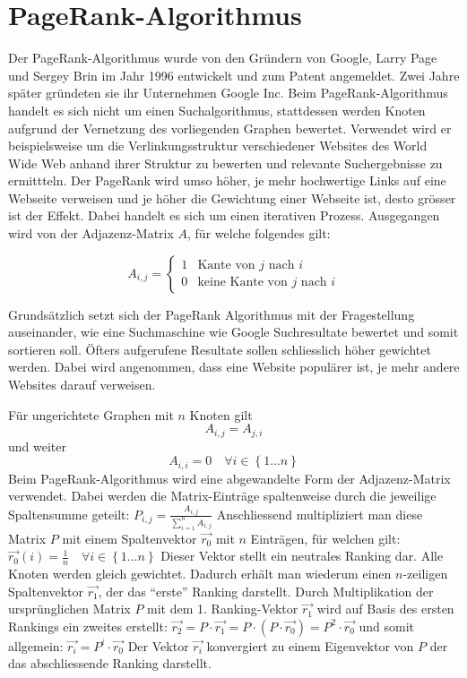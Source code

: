 \section{PageRank-Algorithmus}
Der PageRank-Algorithmus wurde von den Gründern von Google, Larry Page und Sergey Brin im Jahr 1996 entwickelt und zum Patent angemeldet. Zwei Jahre später gründeten sie ihr Unternehmen Google Inc.
Beim PageRank-Algorithmus handelt es sich nicht um einen Suchalgorithmus, stattdessen werden Knoten aufgrund der Vernetzung des vorliegenden Graphen bewertet.
Verwendet wird er beispielsweise um die Verlinkungsstruktur verschiedener Websites des World Wide Web anhand ihrer Struktur zu bewerten und relevante Suchergebnisse zu ermittteln. Der PageRank wird umso höher, je mehr hochwertige Links auf eine Webseite verweisen und je höher die Gewichtung einer Webseite ist, desto grösser ist der Effekt.
Dabei handelt es sich um einen iterativen Prozess. Ausgegangen wird von der Adjazenz-Matrix $A$, für welche folgendes gilt:

\begin{equation}
A_{i,j}=\left\{ \begin{matrix}
1 & \text{Kante von $j$ nach $i$} \\ 0 & \text{keine Kante von $j$ nach $i$}
\end{matrix}
 \right.
\label{verkehr:Adja}
\end{equation}

Grundsätzlich setzt sich der PageRank Algorithmus mit der Fragestellung auseinander, wie eine Suchmaschine wie Google Suchresultate bewertet und somit sortieren soll. Öfters aufgerufene Resultate sollen schliesslich höher gewichtet werden. Dabei wird angenommen, dass eine Website populärer ist, je mehr andere Websites darauf verweisen.



Für ungerichtete Graphen mit $n$ Knoten gilt \begin{equation}A_{i,j}=A_{j,i}\end{equation} und weiter \begin{equation}A_{i,i}=0\quad\forall i\in \left\{1\dots n\right\}\end{equation}
Beim PageRank-Algorithmus wird eine abgewandelte Form der Adjazenz-Matrix verwendet.
Dabei werden die Matrix-Einträge spaltenweise durch die jeweilige Spaltensumme geteilt:
\( P_{i,j}=\frac{A_{i,j}}{\sum_{i=1}^{n}A_{i,j}} \)
Anschliessend multipliziert man diese Matrix $P$ mit einem Spaltenvektor $\Vec{r_0}$ mit $n$ Einträgen, für welchen gilt:
\( \Vec{r_0}(i) = \frac{1}{n} \quad\forall i\in \left\{1\dots n\right\} \)
Dieser Vektor stellt ein neutrales Ranking dar. Alle Knoten werden gleich gewichtet.
Dadurch erhält man wiederum einen $n$-zeiligen Spaltenvektor $\Vec{r_1}$, der das ``erste'' Ranking darstellt. Durch Multiplikation der ursprünglichen Matrix $P$ mit dem 1. Ranking-Vektor $\Vec{r_1}$ wird auf Basis des ersten Rankings ein zweites erstellt:
\( \Vec{r_2} = P\cdot\Vec{r_1} = P\cdot(P\cdot\Vec{r_0}) = P^2\cdot\Vec{r_0}\)
und somit allgemein:
\( \Vec{r_i} = P^i\cdot\Vec{r_0}\)
Der Vektor $\Vec{r_i}$ konvergiert zu einem Eigenvektor von $P$ der das abschliessende Ranking darstellt.
